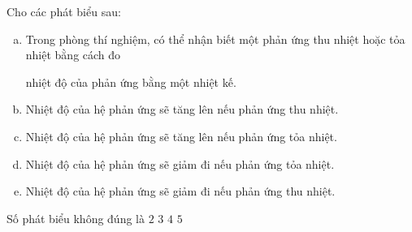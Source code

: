 \documentclass[Main.tex]{subfiles}
\begin{document}
	\begin{ex}
		Cho các phát biểu sau:
		\begin{enumerate}[(a)]
			\item  Trong phòng thí nghiệm, có thể nhận biết một phản ứng thu nhiệt hoặc tỏa nhiệt bằng cách đo
			
			nhiệt độ của phản ứng bằng một nhiệt kế.
			\item  Nhiệt độ của hệ phản ứng sẽ tăng lên nếu phản ứng thu nhiệt.
			\item  Nhiệt độ của hệ phản ứng sẽ tăng lên nếu phản ứng tỏa nhiệt.
			\item  Nhiệt độ của hệ phản ứng sẽ giảm đi nếu phản ứng tỏa nhiệt.
			\item  Nhiệt độ của hệ phản ứng sẽ giảm đi nếu phản ứng thu nhiệt.
		\end{enumerate}
		Số phát biểu không đúng là
		\choice
		{\True $2$}
		{$3$}
		{$4$}
		{$5$}
	\end{ex}
	
\end{document}
